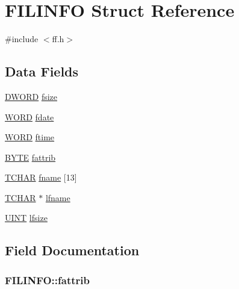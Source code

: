 \hypertarget{structFILINFO}{}\section{F\+I\+L\+I\+N\+FO Struct Reference}
\label{structFILINFO}


{\ttfamily \#include $<$ff.\+h$>$}

\subsection*{Data Fields}
\begin{DoxyCompactItemize}
\item 
\hyperlink{integer_8h_ad342ac907eb044443153a22f964bf0af}{D\+W\+O\+RD} \hyperlink{structFILINFO_aee7441af7dc0c443d1e1e6011cc7dcac}{fsize}
\item 
\hyperlink{integer_8h_a197942eefa7db30960ae396d68339b97}{W\+O\+RD} \hyperlink{structFILINFO_a7c01c48a15b1b49da459924437b0bd52}{fdate}
\item 
\hyperlink{integer_8h_a197942eefa7db30960ae396d68339b97}{W\+O\+RD} \hyperlink{structFILINFO_ae0f751b79621bf7b29669f177bbe6b9a}{ftime}
\item 
\hyperlink{integer_8h_a4ae1dab0fb4b072a66584546209e7d58}{B\+Y\+TE} \hyperlink{structFILINFO_a838d542585831b085537b363f18205c0}{fattrib}
\item 
\hyperlink{ff_8h_a03bdb8ce5895c7e261aadc2529637546}{T\+C\+H\+AR} \hyperlink{structFILINFO_abd852510f2f79b4ec773156d8942dc7c}{fname} \mbox{[}13\mbox{]}
\item 
\hyperlink{ff_8h_a03bdb8ce5895c7e261aadc2529637546}{T\+C\+H\+AR} $\ast$ \hyperlink{structFILINFO_ac4506c29e0219130dff46b01a1b5c023}{lfname}
\item 
\hyperlink{integer_8h_a36cb3b01d81ffd844bbbfb54003e06ec}{U\+I\+NT} \hyperlink{structFILINFO_a2527c511ff4d12d285dbf3c4b3c9fb7b}{lfsize}
\end{DoxyCompactItemize}


\subsection{Field Documentation}
\subsubsection[{\texorpdfstring{fattrib}{fattrib}}]{ F\+I\+L\+I\+N\+F\+O\+::fattrib}\hypertarget{structFILINFO_a838d542585831b085537b363f18205c0}{}\label{structFILINFO_a838d542585831b085537b363f18205c0}
